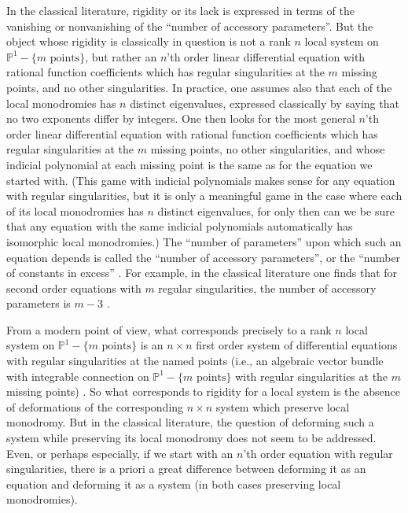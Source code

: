 In the classical literature, rigidity or its lack is expressed in terms of
the vanishing or nonvanishing of the ``number of accessory parameters''.
But the object whose rigidity is classically in question is not a rank
\(n\) local system on \(\mathbb{P}^1-\{m\text{ points}\}\), but rather an
\(n\)'th order linear differential equation with rational function
coefficients which has regular singularities at the \(m\) missing points,
and no other singularities. In practice, one assumes also that each of the
local monodromies has \(n\) distinct eigenvalues, expressed classically by
saying that no two exponents differ by integers. One then looks for the
most general \(n\)'th order linear differential equation with rational
function coefficients which has regular singularities at the \(m\) missing
points, no other singularities, and whose indicial polynomial at each
missing point is the same as for the equation we started with. (This game
with indicial polynomials makes sense for any equation with regular
singularities, but it is only a meaningful game in the case where each of
its local monodromies has \(n\) distinct eigenvalues, for only then can we
be sure that any equation with the same indicial polynomials automatically
has isomorphic local monodromies.) The ``number of parameters'' upon which
such an equation depends is called the ``number of accessory parameters'',
or the ``number of constants in excess'' \cite[\S20.4]{Ince}. For example,
in the classical literature one finds that for second order equations with
\(m\) regular singularities, the number of accessory parameters is
\(m-3\) \cite[top of page 506]{Ince}.

From a modern point of view, what corresponds precisely to a rank \(n\)
local system on \(\mathbb{P}^1-\{m\text{ points}\}\) is an \(n\times n\)
first order system of differential equations with regular singularities
at the named points (i.e., an algebraic vector bundle with integrable
connection on \(\mathbb{P}^1-\{m\text{ points}\}\) with regular
singularities at the \(m\) missing points) \cite{De-ED}. So what corresponds
to rigidity for a local system is the absence of deformations of the
corresponding \(n\times n\) system which preserve local monodromy. But in
the classical literature, the question of deforming such a system while
preserving its local monodromy does not seem to be addressed. Even, or
perhaps especially, if we start with an \(n\)'th order equation with
regular singularities, there is a priori a great difference between
deforming it as an equation and deforming it as a system (in both cases
preserving local monodromies).

